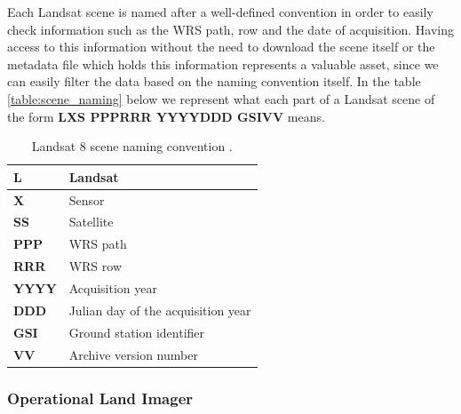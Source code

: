 \documentclass[11pt, a4paper]{report}
\begin{document}
	Each Landsat scene is named after a well-defined convention in order to easily check information such as the WRS path, row and the date of acquisition. Having access to this information without the need to download the scene itself or the metadata file which holds this information represents a valuable asset, since we can easily filter the data based on the naming convention itself. In the table \ref{table:scene_naming} below we represent what each part of a Landsat scene of the form \textbf{LXS PPPRRR YYYYDDD  GSIVV} means.
	\begin{table} [h]
		\center
		\begin{tabularx}{480pt}{|X|X|}
			\toprule
			\textbf{L} & Landsat \\ [0.2ex]
			\midrule
			\textbf{X} & Sensor \\ [0.2ex]
			\midrule
			\textbf{SS} & Satellite \\ [0.2ex]
			\midrule
			\textbf{PPP} & WRS path \\ [0.2ex]
			\midrule
			\textbf{RRR} & WRS row \\ [0.2ex]
			\midrule
			\textbf{YYYY} & Acquisition year \\ [0.2ex]
			\midrule
			\textbf{DDD} & Julian day of the acquisition year \\ [0.2ex]
			\midrule
			\textbf{GSI} & Ground station identifier \\ [0.2ex]
			\midrule
			\textbf{VV} & Archive version number \\ [0.2ex]
			\midrule
			\midrule
			\bottomrule
		\end{tabularx}
		\caption{Landsat 8 scene naming convention \cite{sn}.}
		\label{table:bands_table}
	\end{table}\label{table:scene_naming}
	
	\subsubsection{Operational Land Imager}
	
\end{document}
